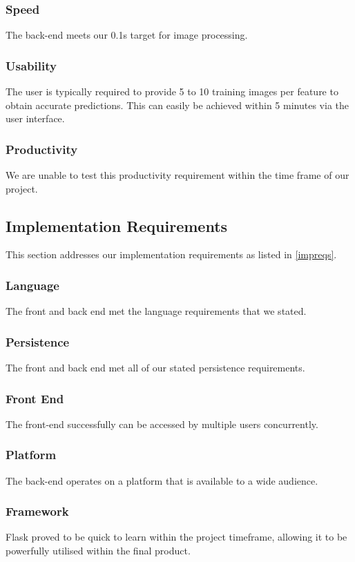 \subsubsection{Speed}
The back-end meets our 0.1s target for image processing.

\subsubsection{Usability}
The user is typically required to provide 5 to 10 training images per feature to obtain accurate predictions. This can easily be achieved within 5 minutes via the user interface.

\subsubsection{Productivity}
We are unable to test this productivity requirement within the time frame of our project.

\subsection{Implementation Requirements}

This section addresses our implementation requirements as listed in \ref{impreqs}.

\subsubsection{Language}
The front and back end met the language requirements that we stated.

\subsubsection{Persistence}
The front and back end met all of our stated persistence requirements.

\subsubsection{Front End}
The front-end successfully can be accessed by multiple users concurrently.

\subsubsection{Platform}
The back-end operates on a platform that is available to a wide audience.

\subsubsection{Framework}
Flask proved to be quick to learn within the project timeframe, allowing it to be powerfully utilised within the final product.

